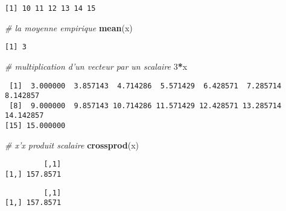 \documentclass[
]{article}
\newenvironment{Shaded}{\begin{snugshade}}{\end{snugshade}}
\newcommand{\CommentTok}[1]{\textcolor[rgb]{0.56,0.35,0.01}{\textit{#1}}}
\newcommand{\DecValTok}[1]{\textcolor[rgb]{0.00,0.00,0.81}{#1}}
\newcommand{\KeywordTok}[1]{\textcolor[rgb]{0.13,0.29,0.53}{\textbf{#1}}}
\newcommand{\NormalTok}[1]{#1}
\newcommand{\OperatorTok}[1]{\textcolor[rgb]{0.81,0.36,0.00}{\textbf{#1}}}
\begin{document}
\begin{verbatim}
[1] 10 11 12 13 14 15
\end{verbatim}

\begin{Shaded}
\begin{Highlighting}[]
\CommentTok{# la moyenne empirique}
\KeywordTok{mean}\NormalTok{(x)}
\end{Highlighting}
\end{Shaded}

\begin{verbatim}
[1] 3
\end{verbatim}

\begin{Shaded}
\begin{Highlighting}[]
\CommentTok{# multiplication d'un vecteur par un scalaire}
\DecValTok{3}\OperatorTok{*}\NormalTok{x}
\end{Highlighting}
\end{Shaded}

\begin{verbatim}
 [1]  3.000000  3.857143  4.714286  5.571429  6.428571  7.285714  8.142857
 [8]  9.000000  9.857143 10.714286 11.571429 12.428571 13.285714 14.142857
[15] 15.000000
\end{verbatim}

\begin{Shaded}
\begin{Highlighting}[]
\CommentTok{# x'x produit scalaire}
\KeywordTok{crossprod}\NormalTok{(x)}
\end{Highlighting}
\end{Shaded}

\begin{verbatim}
         [,1]
[1,] 157.8571
\end{verbatim}

\begin{Shaded}
\end{Shaded}

\begin{verbatim}
         [,1]
[1,] 157.8571
\end{verbatim}
\end{document}
